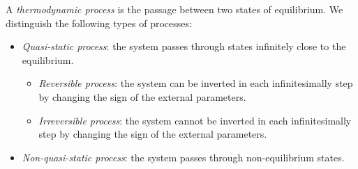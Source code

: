 \documentclass[../../../main.tex]{subfiles}
\begin{document}
\begin{multicols}{2}
\begin{definition}
\begin{center}
\begin{minipage}{0.24\linewidth}
            \end{minipage}
        \end{center}
    \end{definition}
    \begin{definition}
        A \textit{thermodynamic process} is the passage between two states of equilibrium. We distinguish the following types of processes:
        \begin{itemize}
            \item \textit{Quasi-static process}: the system passes through states infinitely close to the equilibrium.
                  \begin{itemize}
                      \item \textit{Reversible process}: the system can be inverted in each infinitesimally step by changing the sign of the external parameters.
                      \item \textit{Irreversible process}: the system cannot be inverted in each infinitesimally step by changing the sign of the external parameters.
                  \end{itemize}
            \item \textit{Non-quasi-static process}: the system passes through non-equilibrium states.
        \end{itemize}
    \end{definition}

\end{multicols}
\end{document}
